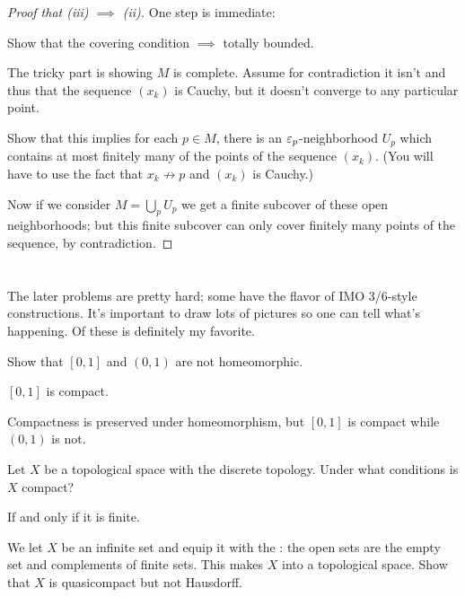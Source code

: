 \begin{proof}
	[Proof that (iii) $\implies$ (ii)]
	One step is immediate:
	\begin{ques}
		Show that the covering condition $\implies$ totally bounded.
	\end{ques}
	The tricky part is showing $M$ is complete.
	Assume for contradiction it isn't and thus that the sequence $(x_k)$ is Cauchy,
	but it doesn't converge to any particular point.
	\begin{ques}
		Show that this implies for each $p \in M$, there is an $\varepsilon_p$-neighborhood $U_p$
		which contains at most finitely many of the points of the sequence $(x_k)$.
		(You will have to use the fact that $x_k \not\to p$ and $(x_k)$ is Cauchy.)
	\end{ques}
	Now if we consider $M = \bigcup_p U_p$ we get a
	finite subcover of these open neighborhoods;
	but this finite subcover can only cover finitely
	many points of the sequence, by contradiction.
\end{proof}


\section{\problemhead}
The later problems are pretty hard;
some have the flavor of IMO 3/6-style constructions.
It's important to draw lots of pictures so one can tell what's happening.
Of these  is definitely my favorite.

\begin{problem}
	Show that $[0,1]$ and $(0,1)$ are not homeomorphic.
	\begin{hint}
		$[0,1]$ is compact.
	\end{hint}
	\begin{sol}
		Compactness is preserved under homeomorphism,
		but $[0,1]$ is compact while $(0,1)$ is not.
	\end{sol}
\end{problem}

\begin{problem}
	Let $X$ be a topological space with the discrete topology.
	Under what conditions is $X$ compact?
	\begin{hint}
		If and only if it is finite.
	\end{hint}
\end{problem}

\begin{problem}
	We let $X$ be an infinite set and equip it with the
	:
	the open sets are the empty set and complements of finite sets.
	This makes $X$ into a topological space.
	Show that $X$ is quasicompact but not Hausdorff.
\end{problem}

